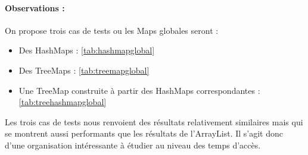 \paragraph{Observations :}
On propose trois cas de tests ou les Maps globales seront :
\begin{itemize}
  \item Des HashMaps :  \ref{tab:hashmapglobal} 
  \item Des TreeMaps :  \ref{tab:treemapglobal} 
  \item Une TreeMap construite à partir des HashMaps correspondantes : \ref{tab:treehashmapglobal} 
\end{itemize}
Les trois cas de tests nous renvoient des résultats relativement similaires mais qui se montrent aussi performants que les résultats de l'ArrayList. Il s'agit donc d'une organisation intéressante à étudier au niveau des temps d'accès.



